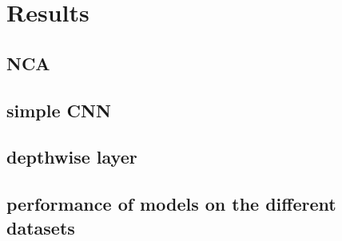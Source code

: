 
\chapter{Results} %
\label{Chapter4} %

\section{NCA}
\section{simple CNN}
\section{depthwise layer}
\section{performance of models on the different datasets}
